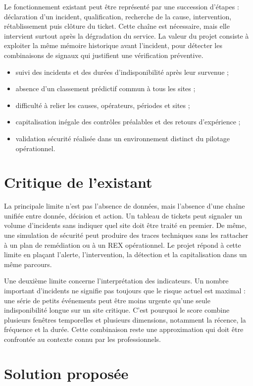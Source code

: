 \documentclass[12pt,a4paper,oneside]{report}
\begin{document}
Le fonctionnement existant peut être représenté par une succession d’étapes : déclaration d’un incident, qualification, recherche de la cause, intervention, rétablissement puis clôture du ticket. Cette chaîne est nécessaire, mais elle intervient surtout après la dégradation du service. La valeur du projet consiste à exploiter la même mémoire historique avant l’incident, pour détecter les combinaisons de signaux qui justifient une vérification préventive.

\begin{itemize}
  \item suivi des incidents et des durées d’indisponibilité après leur survenue ;
  \item absence d’un classement prédictif commun à tous les sites ;
  \item difficulté à relier les causes, opérateurs, périodes et sites ;
  \item capitalisation inégale des contrôles préalables et des retours d’expérience ;
  \item validation sécurité réalisée dans un environnement distinct du pilotage opérationnel.
\end{itemize}

\section{Critique de l’existant}

La principale limite n’est pas l’absence de données, mais l’absence d’une chaîne unifiée entre donnée, décision et action. Un tableau de tickets peut signaler un volume d’incidents sans indiquer quel site doit être traité en premier. De même, une simulation de sécurité peut produire des traces techniques sans les rattacher à un plan de remédiation ou à un REX opérationnel. Le projet répond à cette limite en plaçant l’alerte, l’intervention, la détection et la capitalisation dans un même parcours.

Une deuxième limite concerne l’interprétation des indicateurs. Un nombre important d’incidents ne signifie pas toujours que le risque actuel est maximal : une série de petits événements peut être moins urgente qu’une seule indisponibilité longue sur un site critique. C’est pourquoi le score combine plusieurs fenêtres temporelles et plusieurs dimensions, notamment la récence, la fréquence et la durée. Cette combinaison reste une approximation qui doit être confrontée au contexte connu par les professionnels.

\section{Solution proposée}
\end{document}
